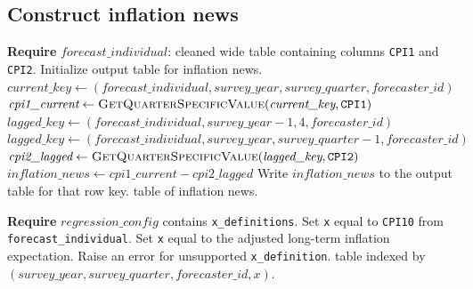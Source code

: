 \documentclass[11pt]{article}
\begin{document}
\subsection{Construct inflation news}

\begin{algorithm}[H]
\caption{\textsc{ConstructInflationNews}$(\textit{forecast\_individual})$}
\begin{algorithmic}[1]
\State \textbf{Require} $\textit{forecast\_individual}$: cleaned wide table
\Statex \quad containing columns \texttt{CPI1} and \texttt{CPI2}.
\State Initialize output table for inflation news.
    \State $\textit{current\_key} \gets (\textit{forecast\_individual}, \textit{survey\_year}, \textit{survey\_quarter}, \textit{forecaster\_id})$
    \State $\textit{cpi1\_current} \gets \textsc{GetQuarterSpecificValue}(\textit{current\_key}, \texttt{CPI1})$
        \State $\textit{lagged\_key} \gets (\textit{forecast\_individual}, \textit{survey\_year} - 1, 4, \textit{forecaster\_id})$
    \Else
        \State $\textit{lagged\_key} \gets (\textit{forecast\_individual}, \textit{survey\_year}, \textit{survey\_quarter} - 1, \textit{forecaster\_id})$
    \EndIf
    \State $\textit{cpi2\_lagged} \gets \textsc{GetQuarterSpecificValue}(\textit{lagged\_key}, \texttt{CPI2})$
    \State $\textit{inflation\_news} \gets \textit{cpi1\_current} - \textit{cpi2\_lagged}$
    \State Write $\textit{inflation\_news}$ to the output table for that row key.
\EndFor
\State \Return table of inflation news.
\end{algorithmic}
\end{algorithm}

\begin{algorithm}[H]
\caption{\textsc{SelectLongTermInflationExpectation}$(\textit{forecast\_individual}, \textit{regression\_config})$}
\begin{algorithmic}[1]
\State \textbf{Require} $\textit{regression\_config}$ contains \texttt{x\_definitions}.
    \State Set \texttt{x} equal to \texttt{CPI10} from \texttt{forecast\_individual}.
    \State Set \texttt{x} equal to the adjusted long-term inflation expectation.
\Else
    \State Raise an error for unsupported \texttt{x\_definition}.
\EndIf
\State \Return table indexed by
\Statex \quad $(\textit{survey\_year}, \textit{survey\_quarter}, \textit{forecaster\_id}, \textit{x})$.
\EndFor
\end{algorithmic}
\end{algorithm}
\end{document}

